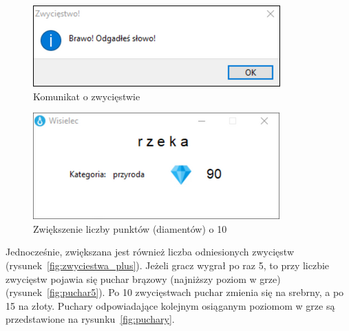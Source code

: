 \documentclass[]{report}
\begin{document}
\begin{figure}[h]
	\centering
	\includegraphics[width=0.5\linewidth]{zwyciestwo}
	\caption{Komunikat o zwycięstwie}
	\label{fig:zwyciestwo}
\end{figure}
\begin{figure}[h]
	\centering
	\includegraphics[width=0.5\linewidth]{8}
	\caption{Zwiększenie liczby punktów (diamentów) o 10}
	\label{fig:zwyciestwo_punkty}
\end{figure}

\FloatBarrier

Jednocześnie, zwiększana jest również liczba odniesionych zwycięstw (rysunek~\ref{fig:zwyciestwa_plus}). Jeżeli gracz wygrał po raz 5, to przy liczbie zwycięstw pojawia się puchar brązowy (najniższy poziom w grze) (rysunek~\ref{fig:puchar5}). Po 10 zwycięstwach puchar zmienia się na srebrny, a po 15 na złoty. Puchary odpowiadające kolejnym osiąganym poziomom w grze są przedstawione na rysunku~\ref{fig:puchary}.
\end{document}
